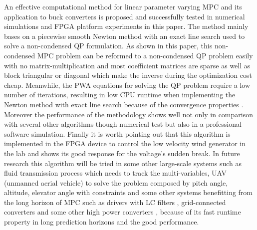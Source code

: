\documentclass[journal]{IEEEtran}
\begin{document}
An effective computational method for linear parameter varying MPC and its application to buck converters is proposed and successfully tested in numerical simulations and FPGA platform experiments in this paper. The method mainly bases on a piecewise smooth Newton method with an exact line search used to solve a non-condensed QP formulation. As shown in this paper, this non-condensed MPC problem can be reformed to a non-condensed QP problem easily with no matrix-multiplication and most coefficient matrices are sparse as well as block triangular or diagonal which make the inverse during the optimization cost cheap. Meanwhile, the PWA equations for solving the QP problem require a low number of iterations, resulting in low CPU runtime when implementing the Newton method with exact line search because of the convergence properties \cite{chen1998newton}. Moreover the performance of the methodology shows well not only in comparison with several other algorithms though numerical test but also in a professional software simulation. Finally it is worth pointing out that this algorithm is implemented in the FPGA device to control the low velocity wind generator in the lab and shows its good response for the voltage's sudden break. In future research this algorithm will be tried in some other large-scale systems such as fluid transmission process \cite{ren2016dynamic,ren2018dynamic} which needs to track the multi-variables, UAV (unmanned aerial vehicle) to solve the problem composed by pitch angle, altitude, elevator angle with constraints \cite{ling2008embedded} and some other systems benefitting from the long horizon of MPC such as drivers with LC filters \cite{geyer2014benefit}, grid-connected converters \cite{lim2017long} and some other high power converters \cite{geyer2017model}, because of its fast runtime property in long prediction horizons and the good performance.




\end{document}
